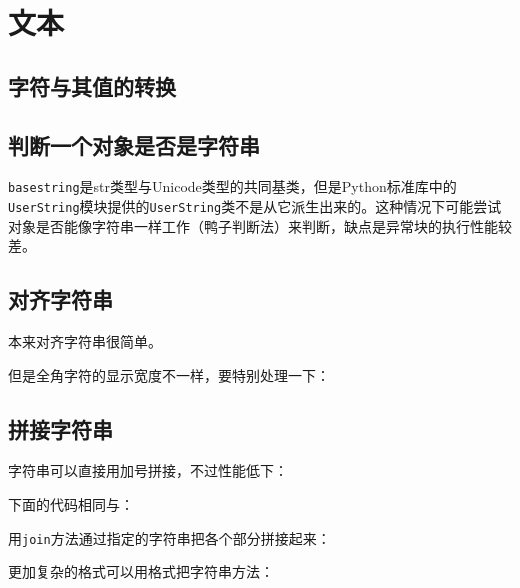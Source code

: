 
\chapter{文本}

	\section{字符与其值的转换}

		

	\section{判断一个对象是否是字符串}

		\verb|basestring|是str类型与Unicode类型的共同基类，但是Python标准库中的\verb|UserString|模块提供的\verb|UserString|类不是从它派生出来的。这种情况下可能尝试对象是否能像字符串一样工作（鸭子判断法）来判断，缺点是异常块的执行性能较差。

		

	\section{对齐字符串}

		本来对齐字符串很简单。
		
		

		但是全角字符的显示宽度不一样，要特别处理一下：

		


	\section{拼接字符串}
		
		字符串可以直接用加号拼接，不过性能低下：

		

		下面的代码相同与：

		

		用\verb|join|方法通过指定的字符串把各个部分拼接起来：

		

		更加复杂的格式可以用格式把字符串方法：

